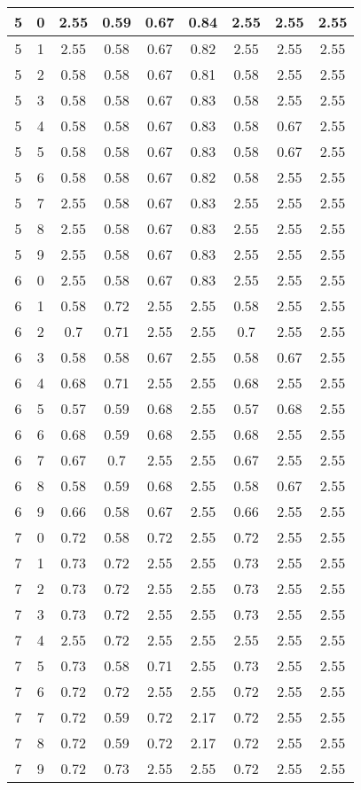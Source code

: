 \begin{longtable}{|c|c||c||c|c|c||c|c|c|}
	5 & 0 & 2.55 & 0.59 & 0.67 & 0.84 & 2.55 & 2.55 & 2.55 \\ \hline
	5 & 1 & 2.55 & 0.58 & 0.67 & 0.82 & 2.55 & 2.55 & 2.55 \\ \hline
	5 & 2 & 0.58 & 0.58 & 0.67 & 0.81 & 0.58 & 2.55 & 2.55 \\ \hline
	5 & 3 & 0.58 & 0.58 & 0.67 & 0.83 & 0.58 & 2.55 & 2.55 \\ \hline
	5 & 4 & 0.58 & 0.58 & 0.67 & 0.83 & 0.58 & 0.67 & 2.55 \\ \hline
	5 & 5 & 0.58 & 0.58 & 0.67 & 0.83 & 0.58 & 0.67 & 2.55 \\ \hline
	5 & 6 & 0.58 & 0.58 & 0.67 & 0.82 & 0.58 & 2.55 & 2.55 \\ \hline
	5 & 7 & 2.55 & 0.58 & 0.67 & 0.83 & 2.55 & 2.55 & 2.55 \\ \hline
	5 & 8 & 2.55 & 0.58 & 0.67 & 0.83 & 2.55 & 2.55 & 2.55 \\ \hline
	5 & 9 & 2.55 & 0.58 & 0.67 & 0.83 & 2.55 & 2.55 & 2.55 \\ \hline
	6 & 0 & 2.55 & 0.58 & 0.67 & 0.83 & 2.55 & 2.55 & 2.55 \\ \hline
	6 & 1 & 0.58 & 0.72 & 2.55 & 2.55 & 0.58 & 2.55 & 2.55 \\ \hline
	6 & 2 & 0.7 & 0.71 & 2.55 & 2.55 & 0.7 & 2.55 & 2.55 \\ \hline
	6 & 3 & 0.58 & 0.58 & 0.67 & 2.55 & 0.58 & 0.67 & 2.55 \\ \hline
	6 & 4 & 0.68 & 0.71 & 2.55 & 2.55 & 0.68 & 2.55 & 2.55 \\ \hline
	6 & 5 & 0.57 & 0.59 & 0.68 & 2.55 & 0.57 & 0.68 & 2.55 \\ \hline
	6 & 6 & 0.68 & 0.59 & 0.68 & 2.55 & 0.68 & 2.55 & 2.55 \\ \hline
	6 & 7 & 0.67 & 0.7 & 2.55 & 2.55 & 0.67 & 2.55 & 2.55 \\ \hline
	6 & 8 & 0.58 & 0.59 & 0.68 & 2.55 & 0.58 & 0.67 & 2.55 \\ \hline
	6 & 9 & 0.66 & 0.58 & 0.67 & 2.55 & 0.66 & 2.55 & 2.55 \\ \hline
	7 & 0 & 0.72 & 0.58 & 0.72 & 2.55 & 0.72 & 2.55 & 2.55 \\ \hline
	7 & 1 & 0.73 & 0.72 & 2.55 & 2.55 & 0.73 & 2.55 & 2.55 \\ \hline
	7 & 2 & 0.73 & 0.72 & 2.55 & 2.55 & 0.73 & 2.55 & 2.55 \\ \hline
	7 & 3 & 0.73 & 0.72 & 2.55 & 2.55 & 0.73 & 2.55 & 2.55 \\ \hline
	7 & 4 & 2.55 & 0.72 & 2.55 & 2.55 & 2.55 & 2.55 & 2.55 \\ \hline
	7 & 5 & 0.73 & 0.58 & 0.71 & 2.55 & 0.73 & 2.55 & 2.55 \\ \hline
	7 & 6 & 0.72 & 0.72 & 2.55 & 2.55 & 0.72 & 2.55 & 2.55 \\ \hline
	7 & 7 & 0.72 & 0.59 & 0.72 & 2.17 & 0.72 & 2.55 & 2.55 \\ \hline
	7 & 8 & 0.72 & 0.59 & 0.72 & 2.17 & 0.72 & 2.55 & 2.55 \\ \hline
	7 & 9 & 0.72 & 0.73 & 2.55 & 2.55 & 0.72 & 2.55 & 2.55 \\ \hline
\end{longtable}
